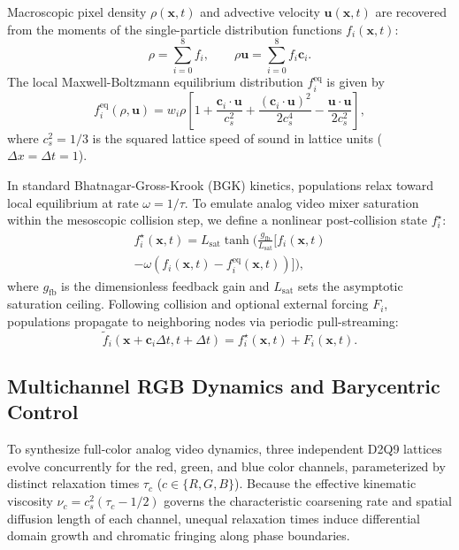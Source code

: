 \documentclass[aps,pre,twocolumn,showpacs,superscriptaddress,floatfix]{revtex4-2}
\begin{document}
Macroscopic pixel density $\rho(\bm{x}, t)$ and advective velocity $\bm{u}(\bm{x}, t)$ are recovered from the moments of the single-particle distribution functions $f_i(\bm{x}, t)$:
\begin{equation}
\rho = \sum_{i=0}^{8} f_i, \qquad \rho \bm{u} = \sum_{i=0}^{8} f_i \bm{c}_i.
\label{eq:moments}
\end{equation}
The local Maxwell-Boltzmann equilibrium distribution $f_i^{\mathrm{eq}}$ is given by
\begin{equation}
f_i^{\mathrm{eq}}(\rho, \bm{u}) = w_i \rho \left[ 1 + \frac{\bm{c}_i \cdot \bm{u}}{c_s^2} + \frac{(\bm{c}_i \cdot \bm{u})^2}{2c_s^4} - \frac{\bm{u} \cdot \bm{u}}{2c_s^2} \right],
\label{eq:equilibrium}
\end{equation}
where $c_s^2 = 1/3$ is the squared lattice speed of sound in lattice units ($\Delta x = \Delta t = 1$).

In standard Bhatnagar-Gross-Krook (BGK) kinetics, populations relax toward local equilibrium at rate $\omega = 1/\tau$. To emulate analog video mixer saturation within the mesoscopic collision step, we define a nonlinear post-collision state $f_i^{\star}$:
\begin{multline}
f_i^{\star}(\bm{x}, t) = L_{\mathrm{sat}} \tanh\Bigg( \frac{g_{\mathrm{fb}}}{L_{\mathrm{sat}}} \Big[ f_i(\bm{x}, t) \\
- \omega \left( f_i(\bm{x}, t) - f_i^{\mathrm{eq}}(\bm{x}, t) \right) \Big] \Bigg),
\label{eq:nonlinear_collision}
\end{multline}
where $g_{\mathrm{fb}}$ is the dimensionless feedback gain and $L_{\mathrm{sat}}$ sets the asymptotic saturation ceiling. Following collision and optional external forcing $F_i$, populations propagate to neighboring nodes via periodic pull-streaming:
\begin{equation}
\tilde{f}_i(\bm{x} + \bm{c}_i \Delta t, t + \Delta t) = f_i^{\star}(\bm{x}, t) + F_i(\bm{x}, t).
\label{eq:streaming}
\end{equation}

\subsection{Multichannel RGB Dynamics and Barycentric Control}

To synthesize full-color analog video dynamics, three independent D2Q9 lattices evolve concurrently for the red, green, and blue color channels, parameterized by distinct relaxation times $\tau_c$ ($c \in \{R, G, B\}$). Because the effective kinematic viscosity $\nu_c = c_s^2(\tau_c - 1/2)$ governs the characteristic coarsening rate and spatial diffusion length of each channel, unequal relaxation times induce differential domain growth and chromatic fringing along phase boundaries.
\end{document}
